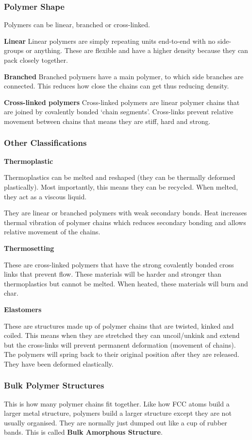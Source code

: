 \documentclass[12pt]{article}
\begin{document}
\subsubsection{Polymer Shape}
Polymers can be linear, branched or cross-linked.

\textbf{Linear}
Linear polymers are simply repeating units end-to-end with no side-groups or anything.
These are flexible and have a higher density because they can pack closely together.

\textbf{Branched}
Branched polymers have a main polymer, to which side branches are connected.
This reduces how close the chains can get thus reducing density.

\textbf{Cross-linked polymers}
Cross-linked polymers are linear polymer chains that are joined by covalently bonded `chain segments'.
Cross-links prevent relative movement between chains that means they are stiff, hard and strong. 

\subsubsection{Other Classifications}
\textbf{Thermoplastic}

Thermoplastics can be melted and reshaped (they can be thermally deformed plastically).
Most importantly, this means they can be recycled.
When melted, they act as a viscous liquid.

They are linear or branched polymers with weak secondary bonds.
Heat increases thermal vibration of polymer chains which reduces secondary bonding and allows relative movement of the chains.

\textbf{Thermosetting}

These are cross-linked polymers that have the strong covalently bonded cross links that prevent flow. 
These materials will be harder and stronger than thermoplastics but cannot be melted.
When heated, these materials will burn and char. 

\textbf{Elastomers} 

These are structures made up of polymer chains that are twisted, kinked and coiled.
This means when they are stretched they can uncoil/unkink and extend but the cross-links will prevent permanent deformation (movement of chains).
The polymers will spring back to their original position after they are released. 
They have been deformed elastically.

\subsubsection{Bulk Polymer Structures}
This is how many polymer chains fit together. 
Like how FCC atoms build a larger metal structure, polymers build a larger structure except they are not usually organised.
They are normally just dumped out like a cup of rubber bands. 
This is called \textbf{Bulk Amorphous Structure}.
\end{document}
